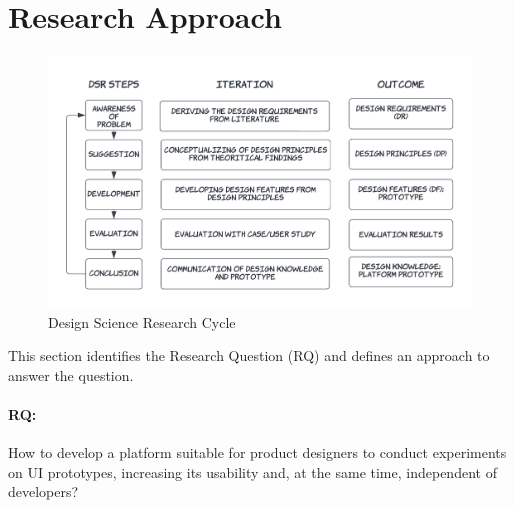 \section{Research Approach}
\label{intro:section:research}
\begin{figure}[ht]
    \centering
    \includegraphics[scale=0.2]{images/solution-ideas/DSRcycle.png}
    \caption{Design Science Research Cycle \cite{paper:designprinciple:vk}}
    \label{intro:fig:dps}
\end{figure}
This section identifies the Research Question (RQ) and defines an approach to answer the question.
\paragraph{RQ:}How to develop a platform suitable for product designers to conduct experiments on UI prototypes, increasing its usability and, at the same time, independent of developers?

